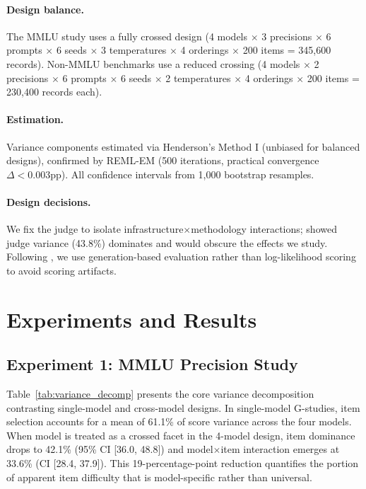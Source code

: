 \documentclass[11pt,letterpaper]{article}
\begin{document}
\paragraph{Design balance.} The MMLU study uses a fully crossed design (4 models $\times$ 3 precisions $\times$ 6 prompts $\times$ 6 seeds $\times$ 3 temperatures $\times$ 4 orderings $\times$ 200 items = 345,600 records). Non-MMLU benchmarks use a reduced crossing (4 models $\times$ 2 precisions $\times$ 6 prompts $\times$ 6 seeds $\times$ 2 temperatures $\times$ 4 orderings $\times$ 200 items = 230,400 records each).

\paragraph{Estimation.} Variance components estimated via Henderson's Method I (unbiased for balanced designs), confirmed by REML-EM (500 iterations, practical convergence $\Delta < 0.003$pp). All confidence intervals from 1,000 bootstrap resamples.

\paragraph{Design decisions.} We fix the judge to isolate infrastructure$\times$methodology interactions; \citet{mesting2026} showed judge variance (43.8\%) dominates and would obscure the effects we study. Following \citet{hua2025emnlp}, we use generation-based evaluation rather than log-likelihood scoring to avoid scoring artifacts.

\section{Experiments and Results}

\subsection{Experiment 1: MMLU Precision Study}
\label{sec:mmlu}

Table~\ref{tab:variance_decomp} presents the core variance decomposition contrasting single-model and cross-model designs. In single-model G-studies, item selection accounts for a mean of 61.1\% of score variance across the four models. When model is treated as a crossed facet in the 4-model design, item dominance drops to 42.1\% (95\% CI [36.0, 48.8]) and model$\times$item interaction emerges at 33.6\% (CI [28.4, 37.9]). This 19-percentage-point reduction quantifies the portion of apparent item difficulty that is model-specific rather than universal.
\end{document}
